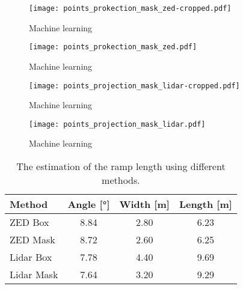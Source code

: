 \begin{figure}[htb]
	\centering
	\texttt{[image: points\_prokection\_mask\_zed-cropped.pdf]}
	\caption{Machine learning}
	\label{fig:points_projection_mask_zed_zoom}
\end{figure}
\begin{figure}[htb]
	\centering
	\texttt{[image: points\_prokection\_mask\_zed.pdf]}
	\caption{Machine learning}
	\label{fig:points_projection_zed_mask}
\end{figure}
\begin{figure}[htb]
	\centering
	\texttt{[image: points\_projection\_mask\_lidar-cropped.pdf]}
	\caption{Machine learning}
	\label{fig:points_projection_mask_lidar_zoom}
\end{figure}
\begin{figure}[htb]
	\centering
	\texttt{[image: points\_projection\_mask\_lidar.pdf]}
	\caption{Machine learning}
	\label{fig:points_projection_lidar_mask}
\end{figure}

\begin{table}[htb]
	\centering
	\caption[Ramp length]{The estimation of the ramp length using different methods.}
	\label{tab:cloud_extraction_estimation}
	\begin{tabular}[t]{lccc}
		\toprule
		\textbf{Method} & \textbf{Angle} [\si{\degree}] & \textbf{Width} [\si{\metre}] & \textbf{Length} [\si{\metre}] \\
		\midrule
		ZED Box         & \SI{8.84}{}                   & \SI{2.80}{}                  & \SI{6.23}[]{}                 \\
		ZED Mask        & \SI{8.72}{}                   & \SI{2.60}{}                  & \SI{6.25}[]{}                 \\
		Lidar Box       & \SI{7.78}{}                   & \SI{4.40}{}                  & \SI{9.69}[]{}                 \\
		Lidar Mask      & \SI{7.64}{}                   & \SI{3.20}{}                  & \SI{9.29}[]{}                 \\
		\bottomrule
	\end{tabular}
\end{table}